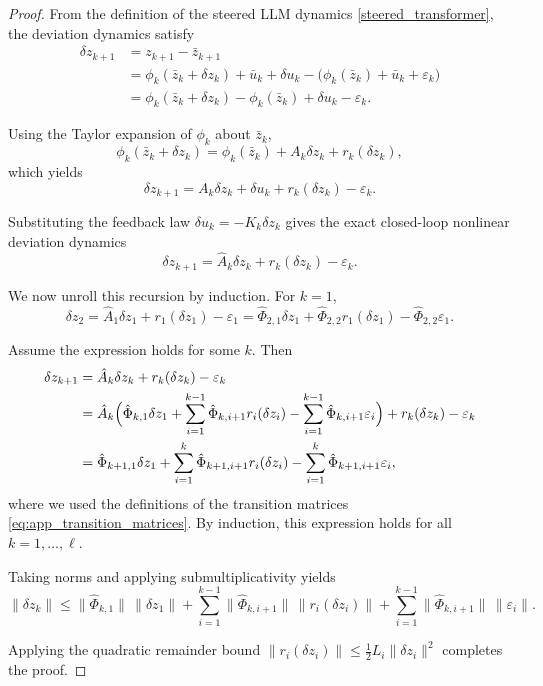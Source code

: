 \documentclass[10pt,a4paper]{amsart}
\begin{document}
\begin{proof}
From the definition of the steered LLM dynamics \eqref{steered_transformer}, the deviation dynamics
satisfy
\begin{align*}
\delta z_{k+1}
&= z_{k+1} - \bar z_{k+1} \\
&= \phi_k(\bar z_k + \delta z_k) + \bar u_k + \delta u_k
   - \bigl(\phi_k(\bar z_k) + \bar u_k + \varepsilon_k\bigr) \\
&= \phi_k(\bar z_k + \delta z_k) - \phi_k(\bar z_k)
   + \delta u_k - \varepsilon_k .
\end{align*}

Using the Taylor expansion of $\phi_k$ about $\bar z_k$,
\[
\phi_k(\bar z_k + \delta z_k)
= \phi_k(\bar z_k) + A_k \delta z_k + r_k(\delta z_k),
\]
which yields
\[
\delta z_{k+1}
= A_k \delta z_k + \delta u_k + r_k(\delta z_k) - \varepsilon_k .
\]

Substituting the feedback law $\delta u_k = -K_k \delta z_k$ gives the exact
closed-loop nonlinear deviation dynamics
\[
\delta z_{k+1}
= \hat A_k \delta z_k + r_k(\delta z_k) - \varepsilon_k .
\]

We now unroll this recursion by induction. For $k=1$,
\[
\delta z_2
= \hat A_1 \delta z_1 + r_1(\delta z_1) - \varepsilon_1
= \hat\Phi_{2,1}\delta z_1
  + \hat\Phi_{2,2} r_1(\delta z_1)
  - \hat\Phi_{2,2} \varepsilon_1 .
\]

Assume the expression holds for some $k$. Then
\begin{align*}
\delta z_{k+1}
&= \hat A_k \delta z_k + r_k(\delta z_k) - \varepsilon_k \\
&= \hat A_k \Bigl(
      \hat\Phi_{k,1} \delta z_1
      + \sum_{i=1}^{k-1} \hat\Phi_{k,i+1} r_i(\delta z_i)
      - \sum_{i=1}^{k-1} \hat\Phi_{k,i+1} \varepsilon_i
    \Bigr)
    + r_k(\delta z_k) - \varepsilon_k \\
&= \hat\Phi_{k+1,1} \delta z_1
  + \sum_{i=1}^{k} \hat\Phi_{k+1,i+1} r_i(\delta z_i)
  - \sum_{i=1}^{k} \hat\Phi_{k+1,i+1} \varepsilon_i ,
\end{align*}
where we used the definitions of the transition matrices
\eqref{eq:app_transition_matrices}. By induction, this expression holds for all
$k = 1,\ldots,\ell$.

Taking norms and applying submultiplicativity yields
\[
\|\delta z_k\|
\le
\|\hat\Phi_{k,1}\|\,\|\delta z_1\|
+ \sum_{i=1}^{k-1} \|\hat\Phi_{k,i+1}\|\,\|r_i(\delta z_i)\|
+ \sum_{i=1}^{k-1} \|\hat\Phi_{k,i+1}\|\,\|\varepsilon_i\| .
\]

Applying the quadratic remainder bound
$\|r_i(\delta z_i)\| \le \tfrac12 L_i \|\delta z_i\|^2$ completes the proof.
\end{proof}
\end{document}
